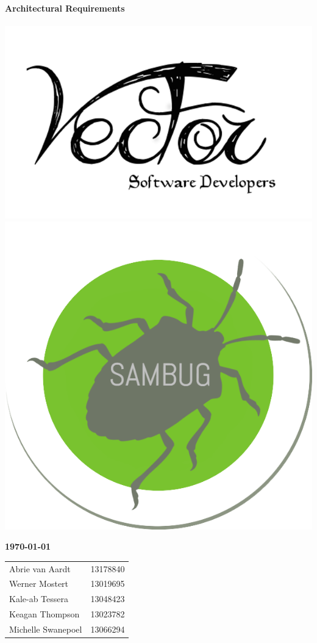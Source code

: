 \documentclass[11pt,a4paper,titlepage]{article}
\begin{document}
\begin{titlepage}
    \vspace*{-0.5cm}
	  \huge \textbf {Architectural Requirements}\\
	  \hfill\\
	\vspace*{-0.5cm}  
      \includegraphics[scale=0.2]{logo}\hfill
	\includegraphics[scale=0.2]{sambug_logo}
         
    \vskip2cm
          
    \large \textbf{\monthyeardate\today}
  
    \vfill
\begin{tabular}{lr}
        	Abrie van Aardt&13178840\\
		Werner Mostert&13019695\\
		Kale-ab Tessera&13048423\\
		Keagan Thompson&13023782\\
		Michelle Swanepoel&13066294\\
	\end{tabular}
\end{titlepage}
\end{document}
